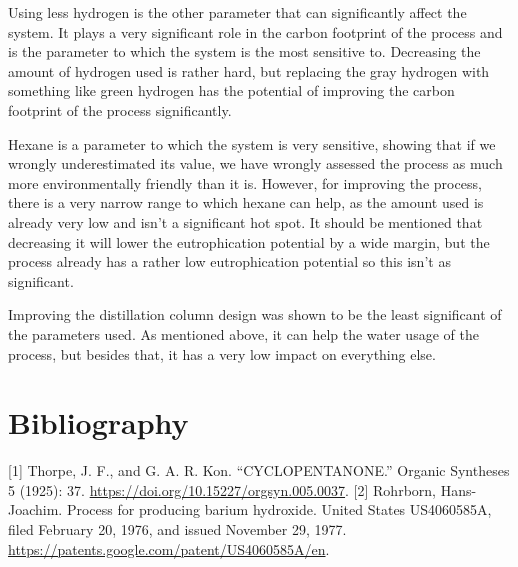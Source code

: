 \documentclass[11pt]{article}
\begin{document}
Using less hydrogen is the other parameter that can significantly affect the system. It plays a very significant role in the carbon footprint of the process and is the parameter to which the system is the most sensitive to. Decreasing the amount of hydrogen used is rather hard, but replacing the gray hydrogen with something like green hydrogen has the potential of improving the carbon footprint of the process significantly.

Hexane is a parameter to which the system is very sensitive, showing that if we wrongly underestimated its value, we have wrongly assessed the process as much more environmentally friendly than it is. However, for improving the process, there is a very narrow range to which hexane can help, as the amount used is already very low and isn't a significant hot spot. It should be mentioned that decreasing it will lower the eutrophication potential by a wide margin, but the process already has a rather low eutrophication potential so this isn't as significant.

Improving the distillation column design was shown to be the least significant of the parameters used. As mentioned above, it can help the water usage of the process, but besides that, it has a very low impact on everything else.

\section{Bibliography}
\label{sec:org8ec07e1}
[1] Thorpe, J. F., and G. A. R. Kon. “CYCLOPENTANONE.” Organic Syntheses 5 (1925): 37. \url{https://doi.org/10.15227/orgsyn.005.0037}.
[2] Rohrborn, Hans-Joachim. Process for producing barium hydroxide. United States US4060585A, filed February 20, 1976, and issued November 29, 1977. \url{https://patents.google.com/patent/US4060585A/en}.
\end{document}
